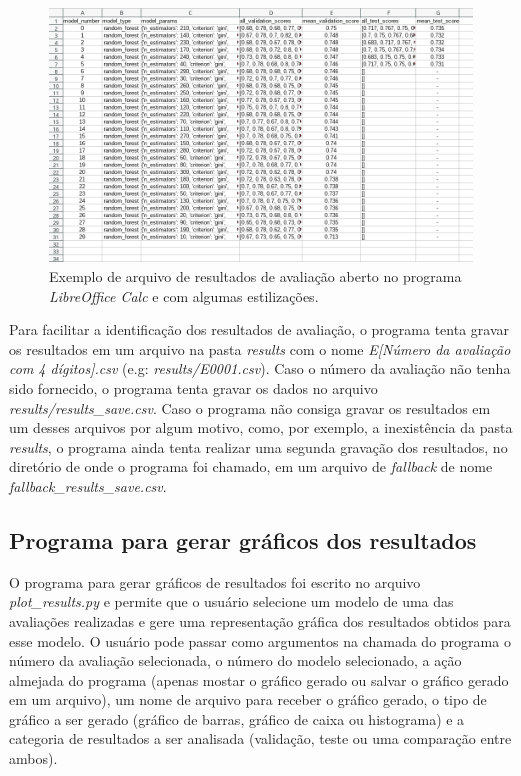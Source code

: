 \begin{figure}[h]
	\centering
	\includegraphics[scale=0.42]{images/exemplo_resultados_avaliacao.png}
	\caption{Exemplo de arquivo de resultados de avaliação aberto no programa \textit{LibreOffice Calc} e com algumas estilizações.}
	\label{fig:example_evaluation_results}
\end{figure}

Para facilitar a identificação dos resultados de avaliação, o programa tenta gravar os resultados em um arquivo na pasta \textit{results} com o nome \textit{E[Número da avaliação com 4 dígitos].csv} (e.g: \textit{results/E0001.csv}). Caso o número da avaliação não tenha sido fornecido, o programa tenta gravar os dados no arquivo \textit{results/results\_save.csv}. Caso o programa não consiga gravar os resultados em um desses arquivos por algum motivo, como, por exemplo, a inexistência da pasta \textit{results}, o programa ainda tenta realizar uma segunda gravação dos resultados, no diretório de onde o programa foi chamado, em um arquivo de \textit{fallback} de nome \textit{fallback\_results\_save.csv}.

\subsection{Programa para gerar gráficos dos resultados}

O programa para gerar gráficos de resultados foi escrito no arquivo \textit{plot\_results.py} e permite que o usuário selecione um modelo de uma das avaliações realizadas e gere uma representação gráfica dos resultados obtidos para esse modelo. O usuário pode passar como argumentos na chamada do programa o número da avaliação selecionada, o número do modelo selecionado, a ação almejada do programa (apenas mostar o gráfico gerado ou salvar o gráfico gerado em um arquivo), um nome de arquivo para receber o gráfico gerado, o tipo de gráfico a ser gerado (gráfico de barras, gráfico de caixa ou histograma) e a categoria de resultados a ser analisada (validação, teste ou uma comparação entre ambos).

